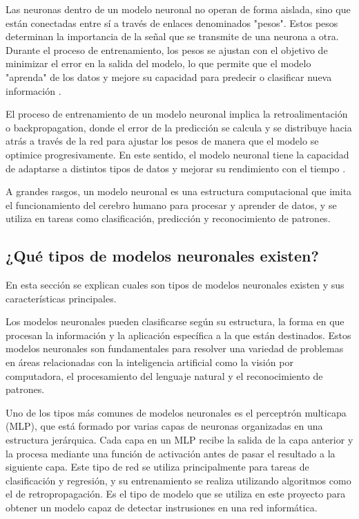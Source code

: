 Las neuronas dentro de un modelo neuronal no operan de forma aislada, sino que están conectadas entre sí a través de enlaces denominados "pesos". Estos pesos determinan la importancia de la señal que se transmite de una neurona a otra. Durante el proceso de entrenamiento, los pesos se ajustan con el objetivo de minimizar el error en la salida del modelo, lo que permite que el modelo "aprenda" de los datos y mejore su capacidad para predecir o clasificar nueva información \cite{haykin2009neural}.

El proceso de entrenamiento de un modelo neuronal implica la retroalimentación o backpropagation, donde el error de la predicción se calcula y se distribuye hacia atrás a través de la red para ajustar los pesos de manera que el modelo se optimice progresivamente. En este sentido, el modelo neuronal tiene la capacidad de adaptarse a distintos tipos de datos y mejorar su rendimiento con el tiempo \cite{nielsen2015neural}.

A grandes rasgos, un modelo neuronal es una estructura computacional que imita el funcionamiento del cerebro humano para procesar y aprender de datos, y se utiliza en tareas como clasificación, predicción y reconocimiento de patrones.


\subsection{¿Qué tipos de modelos neuronales existen?}

En esta sección se explican cuales son tipos de modelos neuronales existen y sus características principales. 

Los modelos neuronales pueden clasificarse según su estructura, la forma en que procesan la información y la aplicación específica a la que están destinados. Estos modelos neuronales son fundamentales para resolver una variedad de problemas en áreas relacionadas con la inteligencia artificial como la visión por computadora, el procesamiento del lenguaje natural y el reconocimiento de patrones.

Uno de los tipos más comunes de modelos neuronales es el perceptrón multicapa (MLP), que está formado por varias capas de neuronas organizadas en una estructura jerárquica. Cada capa en un MLP recibe la salida de la capa anterior y la procesa mediante una función de activación antes de pasar el resultado a la siguiente capa. Este tipo de red se utiliza principalmente para tareas de clasificación y regresión, y su entrenamiento se realiza utilizando algoritmos como el de retropropagación. Es el tipo de modelo que se utiliza en este proyecto para obtener un modelo capaz de detectar instrusiones en una red informática. \cite{goodfellow2016deep}

